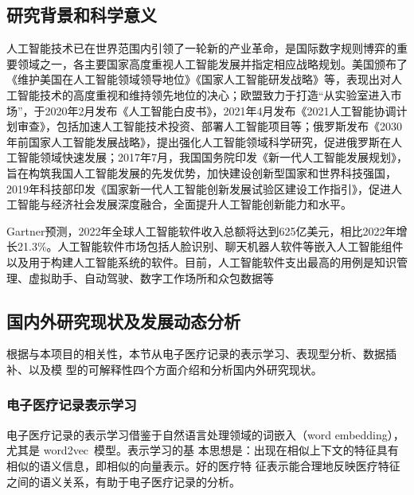 
\subsection{研究背景和科学意义}

人工智能技术已在世界范围内引领了一轮新的产业革命，是国际数字规则博弈的重要领域之一，各主要国家高度重视人工智能发展并指定相应战略规划。美国颁布了《维护美国在人工智能领域领导地位》《国家人工智能研发战略》等，表现出对人工智能技术的高度重视和维持领先地位的决心；欧盟致力于打造“从实验室进入市场”，于2020年2月发布《人工智能白皮书》，2021年4月发布《2021人工智能协调计划审查》，包括加速人工智能技术投资、部署人工智能项目等；俄罗斯发布《2030年前国家人工智能发展战略》，提出强化人工智能领域科学研究，促进俄罗斯在人工智能领域快速发展；2017年7月，我国国务院印发《新一代人工智能发展规划》，旨在构筑我国人工智能发展的先发优势，加快建设创新型国家和世界科技强国，2019年科技部印发《国家新一代人工智能创新发展试验区建设工作指引》，促进人工智能与经济社会发展深度融合，全面提升人工智能创新能力和水平。

Gartner预测，2022年全球人工智能软件收入总额将达到625亿美元，相比2022年增长21.3\%。人工智能软件市场包括人脸识别、聊天机器人软件等嵌入人工智能组件以及用于构建人工智能系统的软件。目前，人工智能软件支出最高的用例是知识管理、虚拟助手、自动驾驶、数字工作场所和众包数据等





\subsection{国内外研究现状及发展动态分析}\label{relatedwork}

根据与本项目的相关性，本节从电子医疗记录的表示学习、表现型分析、数据插补、以及模
型的可解释性四个方面介绍和分析国内外研究现状。

\subsubsection{电子医疗记录表示学习}

电子医疗记录的表示学习借鉴于自然语言处理领域的词嵌入（word embedding），尤其是
word2vec~模型。表示学习的基
本思想是：出现在相似上下文的特征具有相似的语义信息，即相似的向量表示。好的医疗特
征表示能合理地反映医疗特征之间的语义关系，有助于电子医疗记录的分析。

